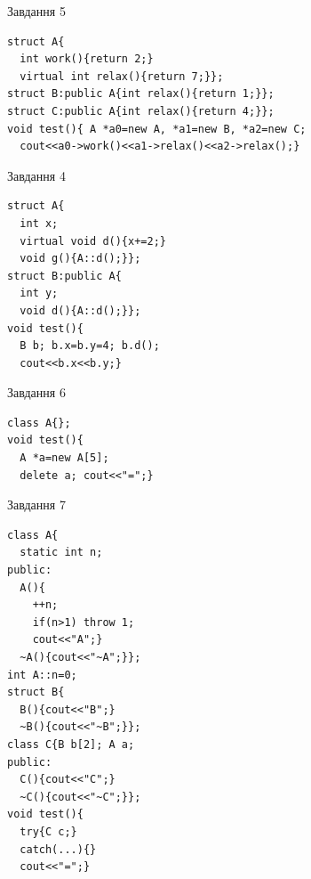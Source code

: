 \documentclass[12pt, ukrainian]{article}
\begin{document}
{{{{\begin{minipage}[t]{11cm}
               
{\begin{center}Завдання {5}\end{center}}
\vspace{-6mm}

\begin{verbatim}
struct A{
  int work(){return 2;}
  virtual int relax(){return 7;}};
struct B:public A{int relax(){return 1;}};
struct C:public A{int relax(){return 4;}};
void test(){ A *a0=new A, *a1=new B, *a2=new C;
  cout<<a0->work()<<a1->relax()<<a2->relax();}
\end{verbatim}            


\end{minipage}
\vline \hspace{8mm}
\begin{minipage}[t]{7cm}
               
{\begin{center}Завдання {4}\end{center}}
\vspace{-6mm}

\begin{verbatim}
struct A{
  int x;
  virtual void d(){x+=2;}
  void g(){A::d();}};
struct B:public A{
  int y;
  void d(){A::d();}};
void test(){
  B b; b.x=b.y=4; b.d();
  cout<<b.x<<b.y;}
\end{verbatim}            


               
{\begin{center}Завдання {6}\end{center}}
\vspace{-6mm}

\begin{verbatim}
class A{};
void test(){
  A *a=new A[5]; 
  delete a; cout<<"=";} 
\end{verbatim}            


               
{\begin{center}Завдання {7}\end{center}}
\vspace{-6mm}

\begin{verbatim}
class A{
  static int n;
public:
  A(){
    ++n; 
    if(n>1) throw 1;
    cout<<"A";}
  ~A(){cout<<"~A";}};
int A::n=0;
struct B{
  B(){cout<<"B";}
  ~B(){cout<<"~B";}};
class C{B b[2]; A a;
public:
  C(){cout<<"C";}
  ~C(){cout<<"~C";}};
void test(){
  try{C c;} 
  catch(...){} 
  cout<<"=";}
\end{verbatim}            



\end{minipage}}}}}
\end{document}
